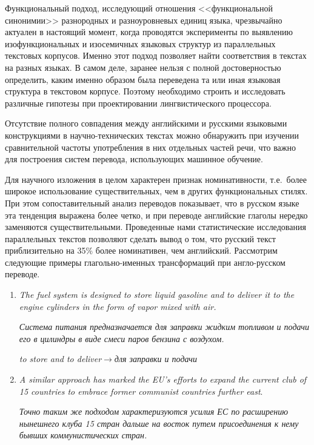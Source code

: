 \begin{multicols}{2}
Функциональный подход, исследующий отношения <<функциональной
синонимии>> разнородных и разноуровневых единиц языка, чрезвычайно
актуален в настоящий момент, когда проводятся эксперименты по
выявлению изофункциональных и изосемичных языковых структур из
параллельных текстовых корпусов. Именно этот подход позволяет найти
соответствия в текстах на разных языках. В самом деле, заранее нельзя с
полной достоверностью определить, каким именно образом была переведена
та или иная языковая структура в текстовом корпусе. Поэтому необходимо
строить и исследовать различные гипотезы при проектировании
лингвистического процессора.

Отсутствие полного совпадения между английскими и русскими
языковыми конструкциями в научно-технических текстах можно обнаружить
при изучении сравнительной частоты употребления в них отдельных частей
речи, что важно для построения систем перевода, использующих машинное
обучение.

Для научного изложения в целом характерен признак номинативности, т.е.\ более 
широкое использование существительных, чем в других функциональных стилях. При 
этом сопоставительный анализ переводов показывает, что в русском языке эта 
тенденция выражена более четко, и при пе\-ре\-воде английские глаголы нередко 
заменяются суще\-ст\-ви\-тель\-ны\-ми. Проведенные нами статистические 
исследования параллельных текстов позволяют сделать вывод о том, что русский 
текст приблизительно на 35\% более номинативен, чем английский. Рассмотрим 
следующие примеры глагольно-именных трансформаций при англо-русском переводе.
\begin{enumerate}[(1)]
\item \textit{The fuel system is designed to store liquid gasoline and to deliver
it to the engine cylinders in the form of vapor mixed with air.}

\textit{Система питания предназначается для заправки жидким
топливом и подачи его в цилиндры в виде смеси паров бензина с
воздухом.}

\textit{to store and to deliver}\;$\rightarrow$\;\textit{для заправки и подачи}
\item \textit{A similar approach has marked the EU's efforts to expand the
current club of 15 countries to embrace former communist countries further
east}.

\textit{Точно таким же подходом характеризуются усилия ЕС по
расширению нынешнего клуба 15 стран дальше на восток путем
присоединения к нему бывших коммунистических стран.}


\end{enumerate}
\end{multicols}
